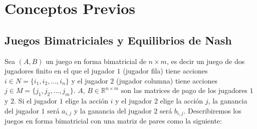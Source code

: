 \chapter{Conceptos Previos}  \label{cap:previos}

\section{Juegos Bimatriciales y Equilibrios de Nash}



Sea $(A, B)$ un juego en forma bimatricial de $n \times m$, es decir un juego de dos jugadores finito en el que el jugador $1$ (jugador fila) tiene acciones $i \in N = \{i_1, i_2, \dots, i_n\}$ y el jugador $2$ (jugador columna) tiene acciones $j \in M = \{j_1, j_2, \dots, j_m\}$. $A$, $B \in \mathbb{R}^{n \times m}$ son las matrices de pago de los jugadores $1$ y $2$. Si el jugador $1$ elige la acción $i$ y el jugador $2$ elige la acción $j$, la ganancia del jugador $1$ será $a_{i,j}$ y la ganancia del jugador $2$ será $b_{i,j}$. Describiremos los juegos en forma bimatricial con una matriz de pares como la siguiente:

